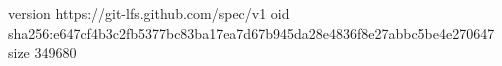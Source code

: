 version https://git-lfs.github.com/spec/v1
oid sha256:e647cf4b3c2fb5377bc83ba17ea7d67b945da28e4836f8e27abbc5be4e270647
size 349680
